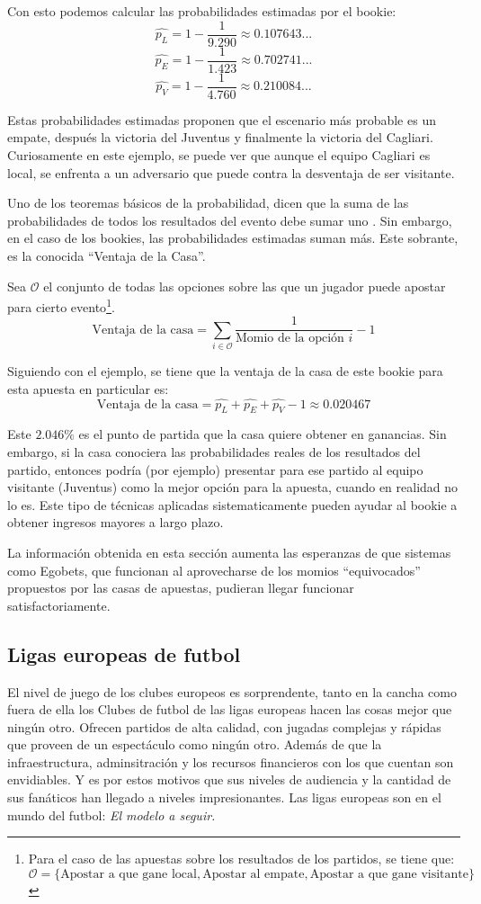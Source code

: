 Con esto podemos calcular las probabilidades estimadas por el bookie:
\[\hat{p_L} = 1 - \frac{1}{9.290} \approx 0.107643...\]
\[\hat{p_E} = 1 - \frac{1}{1.423} \approx 0.702741...\]
\[\hat{p_V} = 1 - \frac{1}{4.760} \approx 0.210084...\]

Estas probabilidades estimadas proponen que el escenario más probable es un empate, después la victoria del Juventus y finalmente la victoria del Cagliari. Curiosamente en este ejemplo, se puede ver que aunque el equipo Cagliari es local, se enfrenta a un adversario que puede contra la desventaja de ser visitante.

Uno de los teoremas básicos de la probabilidad, dicen que la suma de las probabilidades de todos los resultados del evento debe sumar uno \cite{ross2006first}. Sin embargo, en el caso de los bookies, las probabilidades estimadas suman más. Este sobrante, es la conocida ``Ventaja de la Casa''.

Sea $\mathcal{O}$ el conjunto de todas las opciones sobre las que un jugador puede apostar para cierto evento\footnote{Para el caso de las apuestas sobre los resultados de los partidos, se tiene que: $\mathcal{O} = \{\text{Apostar a que gane local}, \text{Apostar al empate}, \text{Apostar a que gane visitante}\}$}.
\[\text{Ventaja de la casa} =  \sum_{i \in \mathcal{O}}{\frac{1}{\text{Momio de la opción } i}} - 1\] 

Siguiendo con el ejemplo, se tiene que la ventaja de la casa de este bookie para esta apuesta en particular es:
\[\text{Ventaja de la casa} = \hat{p_L} + \hat{p_E} + \hat{p_V} - 1 \approx 0.020467\]

Este $2.046\%$ es el punto de partida que la casa quiere obtener en ganancias. Sin embargo, si la casa conociera las probabilidades reales de los resultados del partido, entonces podría (por ejemplo) presentar para ese partido al equipo visitante (Juventus) como la mejor opción para la apuesta, cuando en realidad no lo es. Este tipo de técnicas aplicadas sistematicamente pueden ayudar al bookie a obtener ingresos mayores a largo plazo.

La información obtenida en esta sección aumenta las esperanzas de que sistemas como Egobets, que funcionan al aprovecharse de los momios ``equivocados'' propuestos por las casas de apuestas, pudieran llegar funcionar satisfactoriamente.


\subsection{Ligas europeas de futbol}
El nivel de juego de los clubes europeos es sorprendente, tanto en la cancha como fuera de ella los Clubes de futbol de las ligas europeas hacen las cosas mejor que ningún otro. Ofrecen partidos de alta calidad, con jugadas complejas y rápidas que proveen de un espectáculo como ningún otro. Además de que la infraestructura, adminsitración y los recursos financieros con los que cuentan son envidiables. Y es por estos motivos que sus niveles de audiencia y la cantidad de sus fanáticos han llegado a niveles impresionantes. Las ligas europeas son en el mundo del futbol: \emph{El modelo a seguir.}



